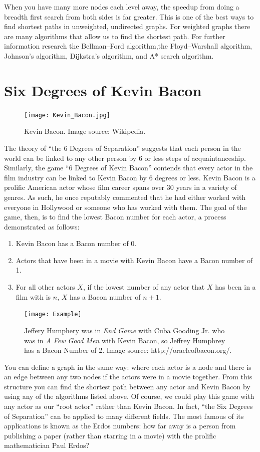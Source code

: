 When you have many more nodes each level away, the speedup from doing a breadth first search from both sides is far greater. This is one of the best ways to find shortest
paths in unweighted, undirected graphs. For weighted graphs there are many algorithms that allow us to find the shortest path. For further information research
the Bellman–Ford algorithm,the Floyd–Warshall algorithm, Johnson's algorithm, Dijkstra's algorithm, and A* search algorithm.

\section*{Six Degrees of Kevin Bacon}
\begin{figure}[h]
\texttt{[image: Kevin\_Bacon.jpg]}
\caption{Kevin Bacon.  Image source: Wikipedia.}
\end{figure}

The theory of ``the 6 Degrees of Separation'' suggests that each person in the world can be linked to any other person by 6 or less steps of acquaintanceship.
Similarly, the game ``6 Degrees of Kevin Bacon'' contends that every actor in the film industry can be linked to Kevin Bacon by 6 degrees or less. Kevin Bacon
is a prolific American actor whose film career spans over 30 years in a variety of genres. As such, he once reputably commented that he had either worked with everyone in
Hollywood or someone who has worked with them. The goal of the game, then, is to find the lowest Bacon number for each actor, a process demonstrated as follows:
\begin{enumerate}
\item Kevin Bacon has a Bacon number of 0.
\item Actors that have been in a movie with Kevin Bacon have a Bacon number of 1.
\item For all other actors $X$, if the lowest number of any actor that $X$ has been in a film with is $n$, $X$ has a Bacon number of $n+1$.
\end{enumerate}

\begin{figure}[h]
\texttt{[image: Example]}
\caption{Jeffery Humphery was in \emph{End Game} with Cuba Gooding Jr. who was in \emph{A Few Good Men} with Kevin Bacon, so Jeffrey Humphrey has a Bacon Number of 2.  Image source: http://oracleofbacon.org/.}
\end{figure}

You can define a graph in the same way: where each actor is a node and there is an edge between any two nodes if the actors were in a movie together. From this structure you can find
the shortest path between any actor and Kevin Bacon by using any of the algorithms listed above. Of course, we could play this game with any actor as our ``root actor'' rather than Kevin Bacon. In
fact, ``the Six Degrees of Separation'' can be applied to many different fields. The most famous of its applications is known as the Erdos numbers: how far away is a person
 from publishing a paper (rather than starring in a movie) with the prolific mathematician Paul Erdos?

